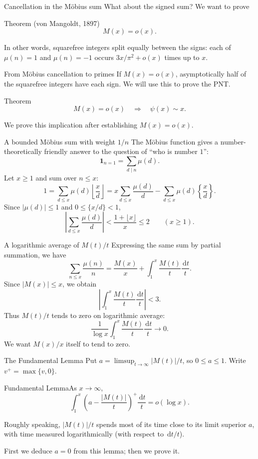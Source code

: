 \documentclass[aspectratio=169,11pt]{beamer}
\newcommand{\ind}{\mathbf1}
\newcommand{\dd}{\,\mathrm d}
\begin{document}
\begin{frame}{Cancellation in the M\"obius sum}
What about the signed sum? We want to prove
\begin{block}{Theorem (von Mangoldt, 1897)}\[M(x)=o(x).\]\end{block}
In other words, squarefree integers split equally between the signs: each of $\mu(n)=1$ and $\mu(n)=-1$ occurs $3x/\pi^2+o(x)$ times up to $x$.
\end{frame}
\begin{frame}{From M\"obius cancellation to primes}
If $M(x)=o(x)$, asymptotically half of the squarefree integers have each sign. We will use this to prove the PNT.
\begin{block}{Theorem}\[M(x)=o(x)\quad\Longrightarrow\quad\psi(x)\sim x.\]\end{block}
We prove this implication after establishing $M(x)=o(x)$.
\end{frame}
\begin{frame}{A bounded M\"obius sum with weight $1/n$}
The M\"obius function gives a number-theoretically friendly answer to the question of ``who is number $1$'':
\[\ind_{n=1}=\sum_{d\mid n}\mu(d).\]
Let $x\ge1$ and sum over $n\le x$:
\[1=\sum_{d\le x}\mu(d)\left\lfloor\frac xd\right\rfloor
=x\sum_{d\le x}\frac{\mu(d)}d-\sum_{d\le x}\mu(d)\left\{\frac xd\right\}.\]
Since $|\mu(d)|\le1$ and $0\le\{x/d\}<1$,
\[\left|\sum_{d\le x}\frac{\mu(d)}d\right|<\frac{1+\lfloor x\rfloor}{x}\le2\qquad(x\ge1).\]

\end{frame}
\begin{frame}{A logarithmic average of $M(t)/t$}
Expressing the same sum by partial summation, we have
\[\sum_{n\le x}\frac{\mu(n)}n=\frac{M(x)}x+\int_1^x\frac{M(t)}t\frac{\dd t}t.\]
Since $|M(x)|\le x$, we obtain
\[\left|\int_1^x\frac{M(t)}t\frac{\dd t}t\right|<3.\]
Thus $M(t)/t$ tends to zero on logarithmic average:
\[\frac1{\log x}\int_1^x\frac{M(t)}t\frac{\dd t}t\longrightarrow0.\]
We want $M(x)/x$ itself to tend to zero.
\end{frame}
\begin{frame}{The Fundamental Lemma}
Put $a=\limsup_{t\to\infty}|M(t)|/t$, so $0\le a\le1$. Write $v^+=\max\{v,0\}$.
\begin{block}{Fundamental Lemma}As $x\to\infty$,
\[\int_1^x\left(a-\frac{|M(t)|}t\right)^+\frac{\dd t}t=o(\log x).\]\end{block}
Roughly speaking, $|M(t)|/t$ spends most of its time close to its limit superior $a$, with time measured logarithmically (with respect to $\dd t/t$).

First we deduce $a=0$ from this lemma; then we prove it.
\end{frame}
\end{document}

